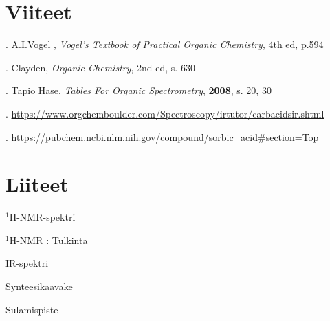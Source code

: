 \documentclass[11pt,a4paper]{article}
\begin{document}
\pagebreak

\section{Viiteet}
. A.I.Vogel , \textit{Vogel's Textbook of Practical Organic Chemistry}, 4th ed, p.594

. Clayden, \textit{Organic Chemistry}, 2nd ed, s. 630

. Tapio Hase, \textit{Tables For Organic Spectrometry}, \textbf{2008}, s. 20, 30

. \url{https://www.orgchemboulder.com/Spectroscopy/irtutor/carbacidsir.shtml}

. \url{https://pubchem.ncbi.nlm.nih.gov/compound/sorbic_acid#section=Top}

\section{Liiteet}

\noindent $^1$H-NMR-spektri
 
 \noindent $^1$H-NMR : Tulkinta
 
 \noindent IR-spektri
 
 \noindent Synteesikaavake
 
 \noindent Sulamispiste
\end{document}
